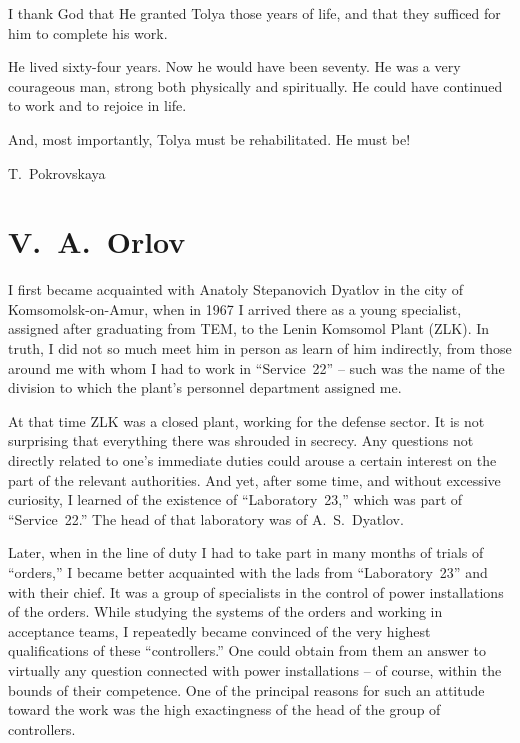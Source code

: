 \documentclass[openright]{bookest}
\begin{document}
I thank God that He granted Tolya those years of life, and that they sufficed for him to complete his work.

He lived sixty-four years. Now he would have been seventy. He was a very courageous man, strong both physically and spiritually. He could have continued to work and to rejoice in life.

And, most importantly, Tolya must be rehabilitated. He must be!

\begin{flushright}
T.~Pokrovskaya
\end{flushright}

\section*{V.~A.~Orlov}

I first became acquainted with Anatoly Stepanovich Dyatlov in the city of Komsomolsk-on-Amur, when in 1967 I arrived there as a young specialist, assigned after graduating from TEM, to the Lenin Komsomol Plant (ZLK). In truth, I did not so much meet him in person as learn of him indirectly, from those around me with whom I had to work in ``Service~22'' -- such was the name of the division to which the plant's personnel department assigned me.

At that time ZLK was a closed plant, working for the defense sector. It is not surprising that everything there was shrouded in secrecy. Any questions not directly related to one's immediate duties could arouse a certain interest on the part of the relevant authorities. And yet, after some time, and without excessive curiosity, I learned of the existence of ``Laboratory~23,'' which was part of ``Service~22.'' The head of that laboratory was of A.~S.~Dyatlov.

Later, when in the line of duty I had to take part in many months of trials of ``orders,'' I became better acquainted with the lads from ``Laboratory~23'' and with their chief. It was a group of specialists in the control of power installations of the orders. While studying the systems of the orders and working in acceptance teams, I repeatedly became convinced of the very highest qualifications of these ``controllers.'' One could obtain from them an answer to virtually any question connected with power installations -- of course, within the bounds of their competence. One of the principal reasons for such an attitude toward the work was the high exactingness of the head of the group of controllers.
\end{document}
